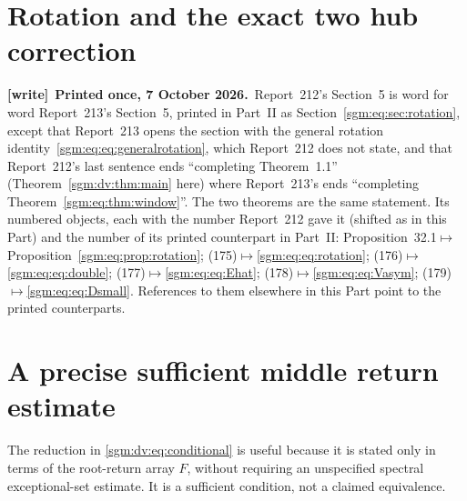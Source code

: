 \documentclass[11pt,letterpaper]{article}
\theoremstyle{remark}\newtheorem{remark}[theorem]{Remark}
\newenvironment{writenote}[1][]{\par\smallskip\begingroup\small
 \noindent\textbf{[write]}\if\relax\detokenize{#1}\relax\else~\textbf{#1.}\fi\ }%
 {\par\endgroup\smallskip}
\theoremstyle{definition}\newtheorem{definition}[theorem]{Definition}
\begin{document}
\section{Rotation and the exact two hub correction}\label{sgm:dv:sec:rotation}
\begin{writenote}[Printed once, 7 October 2026]Report~212's Section~5 is word for word Report~213's Section~5, printed in Part~II as Section~\ref{sgm:eq:sec:rotation}, except that Report~213 opens the section with the general rotation identity~\eqref{sgm:eq:eq:generalrotation}, which Report~212 does not state, and that Report~212's last sentence ends ``completing Theorem~1.1'' (Theorem~\ref{sgm:dv:thm:main} here) where Report~213's ends ``completing Theorem~\ref{sgm:eq:thm:window}''. The two theorems are the same statement. Its numbered objects, each with the number Report~212 gave it (shifted as in this Part) and the number of its printed counterpart in Part~II: Proposition~32.1${}\mapsto{}$Proposition~\ref{sgm:eq:prop:rotation}; (175)${}\mapsto{}$\eqref{sgm:eq:eq:rotation}; (176)${}\mapsto{}$\eqref{sgm:eq:eq:double}; (177)${}\mapsto{}$\eqref{sgm:eq:eq:Ehat}; (178)${}\mapsto{}$\eqref{sgm:eq:eq:Vasym}; (179)${}\mapsto{}$\eqref{sgm:eq:eq:Dsmall}. References to them elsewhere in this Part point to the printed counterparts.
\end{writenote}
\addtocounter{equation}{5}%
\section{A precise sufficient middle return estimate}\label{sgm:dv:sec:tail}
The reduction in \eqref{sgm:dv:eq:conditional} is useful because it is stated only in terms of the root-return array $F$, without requiring an unspecified spectral exceptional-set estimate. It is a sufficient condition, not a claimed equivalence.
\end{document}
